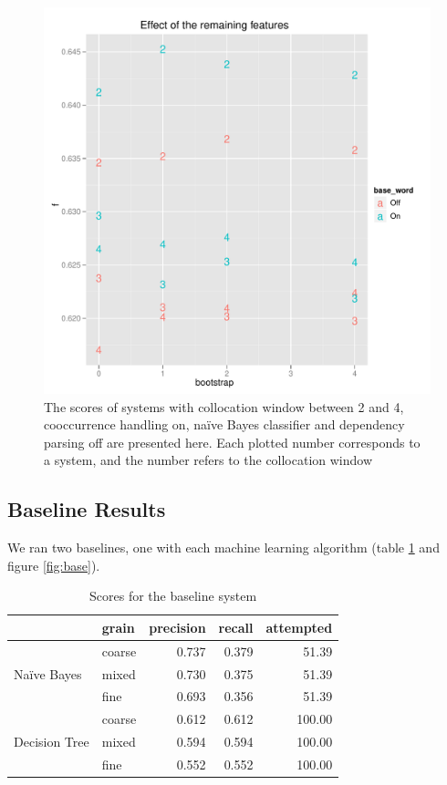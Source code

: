 \documentclass{article}
\newcommand{\naive}{na\"ive}
\newcommand{\Naive}{Na\"ive}
\begin{document}
\begin{figure}
\includegraphics[width=\textwidth]{pg_0004}
\caption{\label{fig4}The scores of systems with collocation window between 2 and 4, cooccurrence handling on, \naive{} Bayes classifier and dependency parsing off are presented here. Each plotted number corresponds to a system, and the number refers to the collocation window}
\end{figure}



\subsection{Baseline Results}

We ran two baselines, one with each machine learning algorithm (table \ref{tab:base} and figure \ref{fig:base}).

\begin{table}
\begin{tabular}{l l | r r r}
& grain& precision& recall& attempted\\
\hline
\multirow{3}{*}{\Naive{} Bayes} &
coarse  &  0.737 & 0.379 &   51.39\\
&mixed  &  0.730 & 0.375 &   51.39\\
& fine  &  0.693 & 0.356 &   51.39\\
\multirow{3}{*}{Decision Tree} &
coarse  &  0.612 & 0.612 &  100.00\\
&mixed  &  0.594 & 0.594 &  100.00\\
& fine  &  0.552 & 0.552 &  100.00\\
\end{tabular}
\caption{\label{tab:base}Scores for the baseline system}
\end{table}
\end{document}
